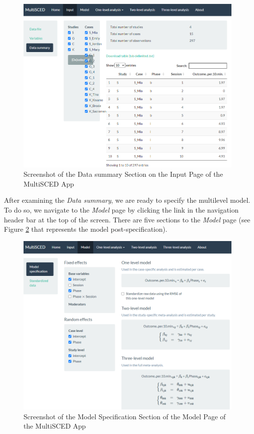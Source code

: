 \documentclass[
]{book}
\begin{document}
\begin{figure}
\includegraphics[width=0.6\linewidth]{images/MultiSCED_input.datasummary_BSP} \caption{Screenshot of the Data summary Section on the Input Page of the MultiSCED App}\label{fig:MultiSCED-input-datasummary-BSP}
\end{figure}

After examining the \emph{Data summary}, we are ready to specify the multilevel model. To do so, we navigate to the \emph{Model} page by clicking the link in the navigation header bar at the top of the screen. There are five sections to the \emph{Model} page (see Figure \ref{fig:MultiSCED-modelspec-BSP} that represents the model post-specification).

\begin{figure}
\includegraphics[width=0.6\linewidth]{images/MultiSCED_model.modelspec_BSP} \caption{Screenshot of the Model Specification Section of the Model Page of the MultiSCED App}\label{fig:MultiSCED-modelspec-BSP}
\end{figure}
\end{document}
